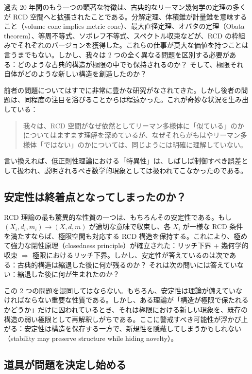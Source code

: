 \documentclass[lualatex]{ltjsarticle}
\begin{document}
過去 20 年間のもう一つの顕著な特徴は、古典的なリーマン幾何学の定理の多くが RCD 空間へと拡張されたことである。分解定理、体積錐が計量錐を意味すること（volume cone implies metric cone）、最大直径定理、オバタの定理（Obata theorem）、等周不等式、ソボレフ不等式、スペクトル収束などが、RCD の枠組みでそれぞれのバージョンを獲得した。これらの仕事が莫大な価値を持つことは言うまでもない。しかし、我々は 2 つの全く異なる問題を区別する必要がある：どのような古典的構造が極限の中でも保持されるのか？ そして、極限それ自体がどのような新しい構造を創造したのか？

前者の問題についてはすでに非常に豊かな研究がなされてきた。しかし後者の問題は、同程度の注目を浴びることからは程遠かった。これが奇妙な状況を生み出している：

\begin{quote}
我々は、RCD 空間がなぜ依然としてリーマン多様体に「似ている」のかについてはますます理解を深めているが、なぜそれらがもはやリーマン多様体「ではない」のかについては、同じようには明確に理解していない。
\end{quote}

言い換えれば、低正則性理論における「特異性」は、しばしば制御すべき誤差として扱われ、説明されるべき数学的現象としては扱われてこなかったのである。

\subsection{安定性は終着点となってしまったのか？}

RCD 理論の最も驚異的な性質の一つは、もちろんその安定性である。もし $(X_i,d_i,m_i) \longrightarrow (X,d,m)$ が適切な意味で収束し、各 $X_i$ が一様な RCD 条件を満たすならば、極限空間も対応する RCD 構造を保持する。これにより、極めて強力な閉性原理（closedness principle）が確立された：リッチ下界 + 幾何学的収束 $\Longrightarrow$ 極限におけるリッチ下界。しかし、安定性が答えているのは次である：古典的構造は縮退した後に何が残るのか？ それは次の問いには答えていない：縮退した後に何が生まれたのか？

この 2 つの問題を混同してはならない。もちろん、安定性は理論が備えていなければならない重要な性質である。しかし、ある理論が「構造が極限で保たれるかどうか」だけに囚われているとき、それは極限における新しい現象を、既存の構造の弱い極限として再解釈しがちである。ここに警戒すべき可能性が浮かび上がる：安定性は構造を保存する一方で、新規性を隠蔽してしまうかもしれない（stability may preserve structure while hiding novelty）。

\subsection{道具が問題を決定し始める}
\end{document}
